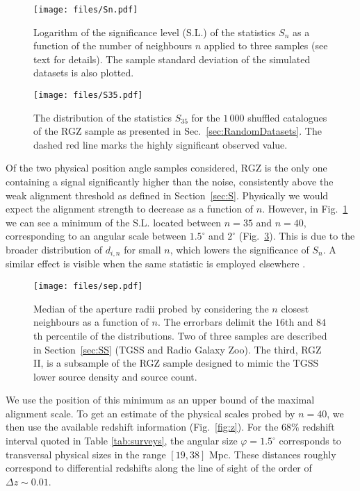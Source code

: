 	
		\begin{figure}
			\centering
			\texttt{[image: files/Sn.pdf]}
			\caption{Logarithm of the significance level (S.L.) of the statistics $S_n$ as a function of the number of neighbours $n$ applied to three samples (see text for details). The sample standard deviation of the simulated datasets is also plotted.}
			\label{fig:Sn}
		\end{figure}
		

		\begin{figure}
			\centering
			\texttt{[image: files/S35.pdf]}
			\caption{The distribution of the statistics $S_{35}$ for the $1\,000$ shuffled catalogues of the RGZ sample as presented in Sec.~\ref{sec:RandomDatasets}. The dashed red line marks the highly significant observed value. }
			\label{fig:S35}
		\end{figure}
				
	Of the two physical position angle samples considered, RGZ is the only one containing a signal significantly higher than the noise, consistently above the weak alignment threshold as defined in Section~\ref{sec:S}. Physically we would expect the alignment strength to decrease as a function of $n$. However, in Fig.~\ref{fig:Sn} we can see a minimum of the S.L. located between $n = 35$ and $n=40$, corresponding to an angular scale between $1.5^\circ$ and $2^\circ$ (Fig.~\ref{fig:sep}). This is due to the broader distribution of $d_{i, n}$ for small $n$, which lowers the significance of $S_n$. A similar effect is visible when the same statistic is employed elsewhere \citep[e.g.][]{Lamy2001}.
	
		\begin{figure}
			\centering
			\texttt{[image: files/sep.pdf]}
			\caption{Median of the aperture radii probed by considering the $n$ closest neighbours as a function of $n$. The errorbars delimit the $16$th and $84$th percentile of the distributions. Two of three samples are described in Section~\ref{sec:SS} (TGSS and Radio Galaxy Zoo). The third, RGZ II, is a subsample of the RGZ sample designed to mimic the TGSS lower source density and source count.}
			\label{fig:sep}
		\end{figure}
		
	We use the position of this minimum as an upper bound of the maximal alignment scale. To get an estimate of the physical scales probed by $n=40$, we then use the available redshift information (Fig.~\ref{fig:z}). For the $68\%$ redshift interval quoted in Table \ref{tab:surveys}, the angular size $\varphi = 1.5^\circ$ corresponds to transversal physical sizes in the range $[19, 38]$ Mpc.  These distances roughly correspond to differential redshifts along the line of sight of the order of $\Delta z \sim 0.01$.
	
